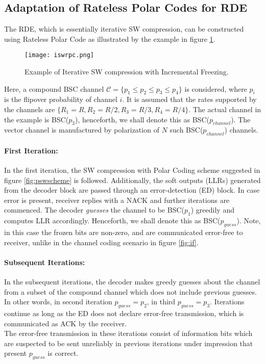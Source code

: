 \documentclass[
11pt, %
a4paper, %
oneside, %
headinclude,footinclude, %
BCOR5mm, %
]{scrartcl}
\begin{document}
\subsection{Adaptation of Rateless Polar Codes for RDE}\label{adapt}
The RDE, which is essentially iterative SW compression, can be constructed using Rateless Polar Code as illustrated by the example in figure \ref{fig:iswrpc}.
\begin{figure}[h]
 \begin{center}
    \texttt{[image: iswrpc.png]}
  \end{center}
  \caption{Example of Iterative SW compression with Incremental Freezing.}
  \label{fig:iswrpc}
\end{figure} 
Here, a compound BSC channel $\mathcal{C}=\{ p_1 \leq p_2 \leq p_3 \leq p_4\}$ is considered, where $p_i$ is the flipover probability of channel $i$. It is assumed that the rates supported by the channels are $\{ R_1=R, R_2= R/2,R_3= R/3,R_4= R/4\}$. The actual channel in the example is BSC($p_3$), henceforth, we shall denote this as BSC($p_{channel}$). The vector channel is manufactured by polarization of $N$ such BSC($p_{channel}$) channels.
\paragraph{First Iteration:} In the first iteration, the SW compression with Polar Coding scheme suggested in figure \ref{fig:pswscheme} is followed. Additionally, the soft outputs (LLRs) generated from the decoder block are passed through an error-detection (ED) block. In case error is present, receiver replies with a NACK and further iterations are commenced. The decoder \emph{guesses} the channel to be BSC($p_1$) greedily and computes LLR accordingly. Henceforth, we shall denote this as BSC($p_{guess}$). Note, in this case the frozen bits are non-zero, and are communicated error-free to receiver, unlike in the channel coding scenario in figure \ref{fig:if}.
\paragraph{Subsequent Iterations:}In the subsequent iterations, the decoder makes greedy guesses about the channel from a subset of the compound channel which does not include previous guesses. In other words, in second iteration $p_{guess}=p_2$, in third $p_{guess}=p_3$. Iterations continue as long as the ED does not declare error-free transmission, which is communicated as ACK by the receiver.\\
The error-free transmission in these iterations consist of information bits which are suspected to be sent unreliably in previous iterations under impression that present $p_{guess}$ is correct. 
\end{document}
